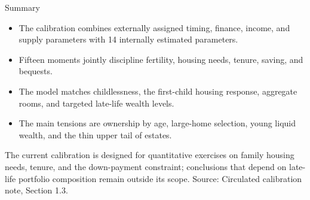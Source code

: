 \documentclass[aspectratio=169,11pt]{beamer}
\newcommand{\source}[1]{\vfill{\color{Muted}\tiny Source: #1}}
\newcommand{\tightitems}{\setlength{\itemsep}{0.55em}}
\begin{document}
\begin{frame}{Summary}
  \large
  \begin{itemize}\tightitems
    \item The calibration combines externally assigned timing, finance, income, and supply parameters with 14 internally estimated parameters.
    \item Fifteen moments jointly discipline fertility, housing needs, tenure, saving, and bequests.
    \item The model matches childlessness, the first-child housing response, aggregate rooms, and targeted late-life wealth levels.
    \item The main tensions are ownership by age, large-home selection, young liquid wealth, and the thin upper tail of estates.
  \end{itemize}

  \vspace{0.7em}
  The current calibration is designed for quantitative exercises on family housing needs, tenure, and the down-payment constraint; conclusions that depend on late-life portfolio composition remain outside its scope.
  \source{Circulated calibration note, Section 1.3.}
\end{frame}
\end{document}
